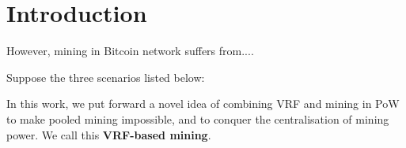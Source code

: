 \section{Introduction}




However, mining in Bitcoin network suffers from....



Suppose the three scenarios listed below:






In this work, we put forward a novel idea of combining VRF and mining in PoW to make pooled mining impossible, and to conquer the centralisation of mining power.
We call this \textbf{VRF-based mining}.